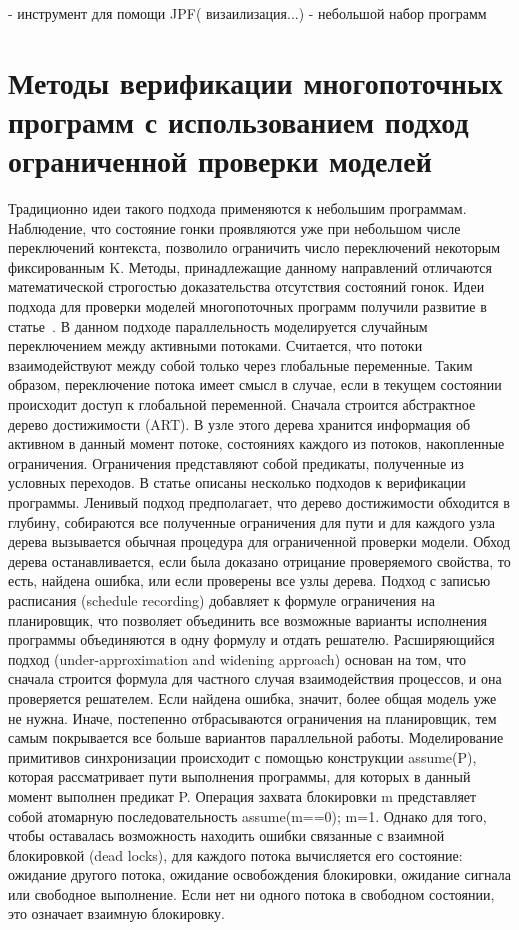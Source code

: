 \cite{Wesonga:2011} - инструмент для помощи JPF( визаилизация...)
\cite{Dourado:2016} - небольшой набор программ

\section{Методы верификации многопоточных программ с использованием подход ограниченной проверки моделей}
\label{rw:bmc}

Традиционно идеи такого подхода применяются к небольшим программам. Наблюдение, что состояние гонки проявляются уже при небольшом числе переключений контекста, позволило ограничить число переключений некоторым фиксированным K. Методы, принадлежащие данному направлений отличаются математической строгостью доказательства отсутствия состояний гонок.
Идеи подхода для проверки моделей многопоточных программ получили развитие в статье~\cite{Cordeiro:2011}. В данном подходе параллельность моделируется случайным переключением между активными потоками. Считается, что потоки взаимодействуют между собой только через глобальные переменные. Таким образом, переключение потока имеет смысл в случае, если в текущем состоянии происходит доступ к глобальной переменной. 
Сначала строится абстрактное дерево достижимости (ART). В узле этого дерева хранится информация об активном в данный момент потоке, состояниях каждого из потоков, накопленные ограничения. Ограничения представляют собой предикаты, полученные из условных переходов. 
В статье описаны несколько подходов к верификации программы.
Ленивый подход предполагает, что дерево достижимости обходится в глубину, собираются все полученные ограничения для пути и для каждого узла дерева вызывается обычная процедура для ограниченной проверки модели. Обход дерева останавливается, если была доказано отрицание проверяемого свойства, то есть, найдена ошибка, или если проверены все узлы дерева.
Подход с записью расписания (schedule recording) добавляет к формуле ограничения на планировщик, что позволяет объединить все возможные варианты исполнения программы объединяются в одну формулу и отдать решателю.
Расширяющийся подход (under-approximation and widening approach) основан на том, что сначала строится формула для частного случая взаимодействия процессов, и она проверяется решателем. Если найдена ошибка, значит, более общая модель уже не нужна. Иначе, постепенно отбрасываются ограничения на планировщик, тем самым покрывается все больше вариантов параллельной работы. 
Моделирование примитивов синхронизации происходит с помощью конструкции assume(P), которая рассматривает пути выполнения программы, для которых в данный момент выполнен предикат P. Операция захвата блокировки m представляет собой атомарную последовательность assume(m==0); m=1. Однако для того, чтобы оставалась возможность находить ошибки связанные с взаимной блокировкой (dead locks), для каждого потока вычисляется его состояние: ожидание другого потока, ожидание освобождения блокировки, ожидание сигнала или свободное выполнение. Если нет ни одного потока в свободном состоянии, это означает взаимную блокировку.
